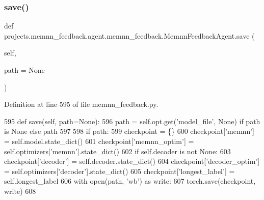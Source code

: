 \subsubsection{\texorpdfstring{save()}{save()}}
{\footnotesize\ttfamily def projects.\+memnn\+\_\+feedback.\+agent.\+memnn\+\_\+feedback.\+Memnn\+Feedback\+Agent.\+save (\begin{DoxyParamCaption}\item[{}]{self,  }\item[{}]{path = {\ttfamily None} }\end{DoxyParamCaption})}



Definition at line 595 of file memnn\+\_\+feedback.\+py.


\begin{DoxyCode}
595     \textcolor{keyword}{def }save(self, path=None):
596         path = self.opt.get(\textcolor{stringliteral}{'model\_file'}, \textcolor{keywordtype}{None}) \textcolor{keywordflow}{if} path \textcolor{keywordflow}{is} \textcolor{keywordtype}{None} \textcolor{keywordflow}{else} path
597 
598         \textcolor{keywordflow}{if} path:
599             checkpoint = \{\}
600             checkpoint[\textcolor{stringliteral}{'memnn'}] = self.model.state\_dict()
601             checkpoint[\textcolor{stringliteral}{'memnn\_optim'}] = self.optimizers[\textcolor{stringliteral}{'memnn'}].state\_dict()
602             \textcolor{keywordflow}{if} self.decoder \textcolor{keywordflow}{is} \textcolor{keywordflow}{not} \textcolor{keywordtype}{None}:
603                 checkpoint[\textcolor{stringliteral}{'decoder'}] = self.decoder.state\_dict()
604                 checkpoint[\textcolor{stringliteral}{'decoder\_optim'}] = self.optimizers[\textcolor{stringliteral}{'decoder'}].state\_dict()
605                 checkpoint[\textcolor{stringliteral}{'longest\_label'}] = self.longest\_label
606             with open(path, \textcolor{stringliteral}{'wb'}) \textcolor{keyword}{as} write:
607                 torch.save(checkpoint, write)
608 
\end{DoxyCode}
\mbox{\label{classprojects_1_1memnn__feedback_1_1agent_1_1memnn__feedback_1_1MemnnFeedbackAgent_a77c9550f6fa662fb4631150f391103b3}} 
